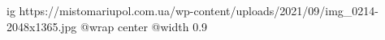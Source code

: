  
 
 
 
 

\ifcmt
  ig https://mistomariupol.com.ua/wp-content/uploads/2021/09/img_0214-2048x1365.jpg
  @wrap center
  @width 0.9
\fi
